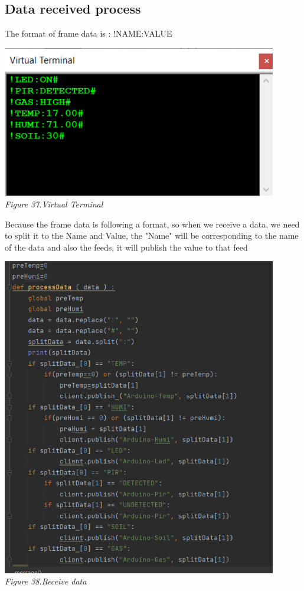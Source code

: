 \documentclass[a4paper]{article}
\begin{document}
\subsection{Data received process}
The format of frame data is : !NAME:VALUE \\
\begin{center}
    \includegraphics[width=12cm]{pictures/VirtualTerminal.png}\\
    \textit{Figure 37.Virtual Terminal}\\
\end{center}
Because the frame data is following a format, so when we receive a data, we need to split it to the Name and Value, the "Name" will be corresponding to the name of the data and also the feeds, it will publish the value to that feed
\begin{center}
    \includegraphics[width=12cm]{pictures/Received_data.png}\\
    \textit{Figure 38.Receive data}\\
\end{center}
\end{document}
